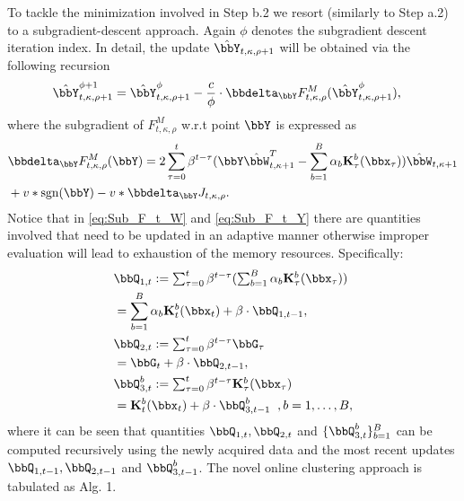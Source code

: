 \documentclass[10pt,final]{IEEEtran}
\begin{document}
To tackle the minimization involved in Step b.2 we resort (similarly to Step a.2) to a subgradient-descent approach. Again $\phi$ denotes the  subgradient descent iteration index. In detail, the update
$\hat{\bbY}_{t,\kappa,\rho+1}$ will be  obtained via the following recursion
\begin{align}\label{eq:Y_sub_descent}
  \hat{\bbY}_{t,\kappa,\rho+1}^{\phi+1}&=
  \hat{\bbY}_{t,\kappa,\rho+1}^{\phi}-\frac{c}{\phi}\cdot \bbdelta_{\bbY}F_{t,\kappa,\rho}^M(\hat{\bbY}_{t,\kappa,\rho+1}^{\phi}), 
\end{align}
where the subgradient of $F_{t,\kappa,\rho}^M$ w.r.t  point $\bbY$ is expressed as
\begin{align}\label{eq:Sub_F_t_Y}
&\bbdelta_{\bbY}F_{t,\kappa,\rho}^M(\bbY) = 2\sum_{\tau=0}^{t}\beta^{t-\tau}({\bbY}\hat{\bbW}_{t,\kappa+1}^T-\sum_{b=1}^{B}\alpha_{b}\mathbf{K}_{\tau}^b(\bbx_{\tau}))\hat{\bbW}_{t,\kappa+1}\nonumber\\
&+v*\textrm{sgn}({\bbY})-v*\bbdelta_{\bbY} J_{t,\kappa,\rho}.
\end{align}
Notice that in \eqref{eq:Sub_F_t_W} and \eqref{eq:Sub_F_t_Y}
there are quantities involved that need to be updated in an adaptive manner otherwise improper evaluation will lead to exhaustion of the memory resources. Specifically:
\begin{align}\label{eq:Adaptive_Quant}
&\bbQ_{1,t}:=\textstyle\sum_{\tau=0}^{t}\beta^{t-\tau}(\sum_{b=1}^{B}\alpha_{b}\mathbf{K}_{\tau}^b(\bbx_{\tau}))\\
&=\sum_{b=1}^{B}\alpha_{b}\mathbf{K}_{t}^b(\bbx_{t})+\beta\cdot \bbQ_{1,t-1},\nonumber\\
&\bbQ_{2,t}:=\textstyle\sum_{\tau=0}^{t}\beta^{t-\tau}\bbG_{\tau}\nonumber\\
&=\bbG_t+\beta\cdot \bbQ_{2,t-1},\nonumber\\
&\bbQ_{3,t}^{b}:=\textstyle\sum_{\tau=0}^{t}\beta^{t-\tau}\mathbf{K}_{\tau}^b(\bbx_{\tau})\nonumber\\
&=\mathbf{K}_{t}^b(\bbx_{t})+\beta\cdot \bbQ_{3,t-1}^b\;\;,b=1,\ldots,B,\nonumber
\end{align}
where it can be seen that quantities $\bbQ_{1,t}, \bbQ_{2,t}$ and $\{\bbQ_{3,t}^b\}_{b=1}^B$ can be computed recursively using the newly acquired data and the most recent updates $\bbQ_{1,t-1}, \bbQ_{2,t-1}$ and $\bbQ_{3,t-1}^b$.
The novel online clustering approach is tabulated as Alg. 1.
\end{document}
